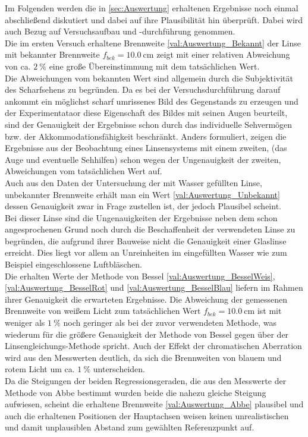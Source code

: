 Im Folgenden werden die in \cref{sec:Auswertung} erhaltenen Ergebnisse 
noch einmal abschließend diskutiert und dabei auf ihre Plausibilität
hin überprüft. Dabei wird auch Bezug auf Versuchsaufbau und -durchführung 
genommen.\\

Die im ersten Versuch erhaltene Brennweite \cref{val:Auswertung_Bekannt} der Linse
mit bekannter Brennweite  $f_{bek} = \SI{10.0}{\cm}$ zeigt mit einer relativen Abweichung 
von ca. $\SI{2}{\percent}$ eine große Übereinstimmung mit 
dem tatsächlichen Wert. \\
Die Abweichungen vom bekannten Wert sind allgemein durch die Subjektivität des 
Scharfsehens zu begründen. Da es bei der Versuchsdurchführung darauf ankommt ein möglichst
scharf umrissenes Bild des Gegenstands zu erzeugen und der Experimentataor diese Eigenschaft 
des Bildes mit seinen Augen beurteilt, sind der Genauigkeit der Ergebnisse schon durch 
das individuelle Sehvermögen bzw. der Akkommodationsfähigkeit beschränkt. Anders formuliert, 
zeigen die Ergebnisse aus der Beobachtung eines Linsensystems mit einem zweiten, 
(das Auge und eventuelle Sehhilfen) schon wegen der Ungenauigkeit der zweiten, 
Abweichungen vom tatsächlichen Wert auf. \\

Auch aus den Daten der Untersuchung der mit Wasser gefüllten Linse, unbekannter Brennweite
erhält man ein Wert \cref{val:Auswertung_Unbekannt} dessen Genauigkeit zwar in Frage zustellen ist,
der jedoch Plausibel scheint.\\
Bei dieser Linse sind die Ungenauigkeiten der Ergebnisse neben dem schon angesprochenen Grund
noch durch die Beschaffenheit der verwendeten Linse zu begründen, die aufgrund ihrer Bauweise 
nicht die Genauigkeit einer Glaslinse erreicht. Dies liegt vor allem an Unreinheiten im eingefüllten
Wasser wie zum Beispiel eingeschlossene Luftbläschen.\\

Die erhalten Werte der Methode von Bessel \cref{val:Auswertung_BesselWeis}, \cref{val:Auswertung_BesselRot} 
und \cref{val:Auswertung_BesselBlau} liefern im Rahmen ihrer Genauigkeit die erwarteten Ergebnisse.
Die Abweichung der gemessenen Brennweite von weißem Licht zum tatsächlichen Wert $f_{bek} = \SI{10.0}{\cm}$ 
ist mit weniger als $\SI{1}{\percent}$ noch geringer als bei der zuvor verwendeten Methode,
was wiederum für die größere Genauigkeit der Methode von Bessel gegen über der Linsengleichungs-Methode
spricht. Auch der Effekt der chromatischen Aberration wird aus den Messwerten deutlich, da sich
die Brennweiten von blauem und rotem Licht um ca. $\SI{1}{\percent}$ unterscheiden.\\

Da die Steigungen der beiden Regressionsgeraden, die aus den Messwerte der Methode von Abbe bestimmt wurden
beide die nahezu gleiche Steigung aufwiesen, scheint die erhaltene Brennweite \cref{val:Auswertung_Abbe} 
plausibel und auch die erhaltenen Positionen der Hauptachsen weisen keinen unrealistischen 
und damit unplausiblen Abstand zum gewählten Referenzpunkt auf. 



 
 
 